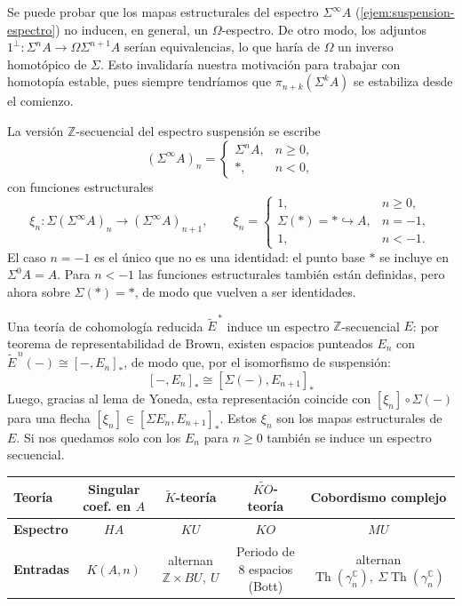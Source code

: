 \begin{nota}
Se puede probar que los mapas estructurales del espectro $\Sigma^\infty A$ (\cref{ejem:suspension-espectro}) no inducen, en general, un $\Omega$-espectro. De otro modo, los adjuntos $1^\perp\colon\Sigma^n A \to \Omega\Sigma^{n+1} A$ serían equivalencias, lo que haría de $\Omega$ un inverso homotópico de $\Sigma$. Esto invalidaría nuestra motivación para trabajar con homotopía estable, pues siempre tendríamos que $\pi_{n+k}(\Sigma^kA)$ se estabiliza desde el comienzo. 
\end{nota}

\begin{ejem}\label{ejem:espectro-z-secuencial}
La versión $\mathbb Z$-secuencial del espectro suspensión se escribe
\[
(\Sigma^\infty A)_n=
\begin{cases}
\Sigma^nA, & n\ge0,\\
\ast, & n<0,
\end{cases}
\]
con funciones estructurales
\[
\xi_n\colon\Sigma(\Sigma^\infty A)_n\longrightarrow(\Sigma^\infty A)_{n+1},
\qquad
\xi_n=
\begin{cases}
1, & n\ge0,\\
\Sigma(*)=*\hookrightarrow A, & n=-1,\\
1, & n<-1 .
\end{cases}
\]
El caso $n=-1$ es el único que no es una identidad: el punto base $\ast$ se incluye en $\Sigma^0A=A$. Para $n<-1$ las funciones estructurales también están definidas, pero ahora sobre $\Sigma(\ast)=\ast$, de modo que vuelven a ser identidades.
\end{ejem}

\begin{ejem}\label{ejem:espcoho}
Una teoría de cohomología reducida $\widetilde E^{\,*}$ induce un espectro $\mathbb Z$-secuencial $E$: por teorema de representabilidad de Brown, existen espacios punteados $E_n$ con $\widetilde E^{\,n}(-)\cong[-,E_n]_*$, de modo que, por el isomorfismo de suspensión:
\[
[-,E_{n}]_* \cong [\Sigma(-),E_{n+1}]_*
\]
Luego, gracias al lema de Yoneda, esta representación coincide con $[\xi_n] \circ \Sigma(-)$ para una flecha $[\xi_n]\in[\Sigma E_n, E_{n+1}]_*$. Estos $\xi_n$ son los mapas estructurales de $E$. Si nos quedamos solo con los $E_n$ para $n\ge 0$ también se induce un espectro secuencial.
\begin{center}
\footnotesize
\renewcommand{\arraystretch}{1.4}
\begin{tabular}{|l|c|c|c|c|}
\hline
\textbf{Teoría}
& Singular coef. en $A$
& $\widetilde K$-teoría
& $\widetilde{KO}$-teoría
& Cobordismo complejo \\ \hline

\textbf{Espectro}
& $HA$
& $KU$
& $KO$
& $MU$ \\ \hline

\textbf{Entradas}
& $K(A,n)$
& alternan $\mathbb Z\times BU,\ U$
& Periodo de 8 espacios (Bott)
& alternan $\operatorname{Th}(\gamma_n^{\mathbb C}),\ 
  \Sigma\operatorname{Th}(\gamma_n^{\mathbb C})$ \\ \hline
\end{tabular}
\end{center}
\end{ejem}


